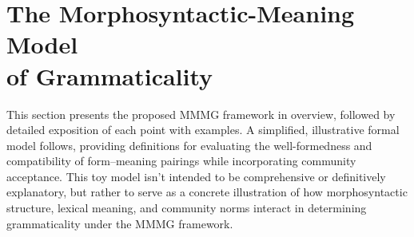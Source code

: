 \documentclass[12pt,letterpaper]{article}
\begin{document}
\section{The Morphosyntactic-Meaning Model \\of Grammaticality}\label{sec:framework}

This section presents the proposed MMMG framework in overview, followed by detailed exposition of each point with examples. A simplified, illustrative formal model follows, providing definitions for evaluating the well-formedness and compatibility of form--meaning pairings while incorporating community acceptance. This toy model isn't intended to be comprehensive or definitively explanatory, but rather to serve as a concrete illustration of how morphosyntactic structure, lexical meaning, and community norms interact in determining grammaticality under the MMMG framework.
\end{document}
